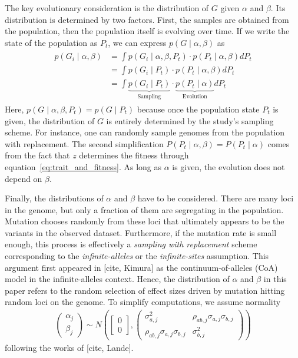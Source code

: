 \documentclass[10pt]{article}
\begin{document}
The key evolutionary consideration is the distribution of $G$ given $\alpha$ and $\beta$.
Its distribution is determined by two factors.
First, the samples are obtained from the population, then the population itself is evolving over time.
If we write the state of the population as $P_t$,
we can express $p(G \mid \alpha, \beta)$ as
\begin{align} \label{eq:definetti}
    \begin{aligned}
        p(G_i \mid \alpha, \beta) &=
        \int p(G_i \mid \alpha, \beta ,P_t)
        \cdot p(P_t \mid \alpha, \beta) dP_t \\
        &=
        \int p(G_i \mid P_t)
        \cdot p(P_t \mid \alpha, \beta) dP_t \\
        &=
        \int \underbrace{p(G_i \mid P_t)}_{\text{Sampling}}
        \cdot \underbrace{p(P_t \mid \alpha)}_{\text{Evolution}} dP_t
    \end{aligned}
\end{align}
Here, $p(G \mid \alpha, \beta, P_t) = p(G \mid P_t)$ because once the population state $P_t$ is given, the distribution of $G$ is entirely determined by the study's sampling scheme.
For instance, one can randomly sample genomes from the population with replacement.
The second simplification $P(P_t \mid \alpha, \beta) = P(P_t \mid \alpha)$ comes from the fact that $z$ determines the fitness through equation~\ref{eq:trait_and_fitness}.
As long as $\alpha$ is given, the evolution does not depend on $\beta$.

Finally, the distributions of $\alpha$ and $\beta$ have to be considered.
There are many loci in the genome, but only a fraction of them are segregating in the population.
Mutation chooses randomly from these loci that ultimately appears to be the variants in the observed dataset.
Furthermore, if the mutation rate is small enough, this process is effectively a \emph{sampling with replacement} scheme corresponding to the \emph{infinite-alleles} or the \emph{infinite-sites} assumption.
This argument first appeared in [cite, Kimura] as the continuum-of-alleles (CoA) model in the infinite-alleles context.
Hence, the distribution of $\alpha$ and $\beta$ in this paper refers to the random selection of effect sizes driven by mutation hitting random loci on the genome.
To simplify computations,
we assume normality
\begin{gather} \label{eq:coa}
\begin{pmatrix}
        \alpha_j \\
        \beta_j
    \end{pmatrix}
    \sim
    N\left(
    \begin{bmatrix}
        0 \\
        0
    \end{bmatrix}
    , 
    \begin{pmatrix}
        \sigma_{a,j}^2 & \rho_{ab,j}\sigma_{a,j}\sigma_{b,j} \\
        \rho_{ab,j} \sigma_{a,j} \sigma_{b,j} & \sigma_{b,j}^2
    \end{pmatrix} 
    \right)
\end{gather}
following the works of [cite, Lande].
\end{document}
